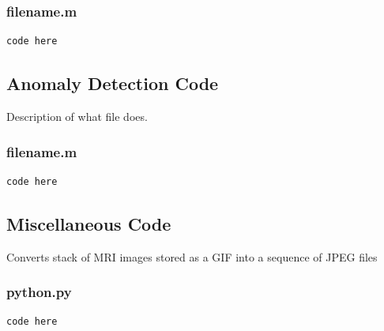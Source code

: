 \documentclass[12pt]{article}
\theoremstyle{plain}%
\theoremstyle{definition}
\theoremstyle{remark}
\begin{document}
\subsubsection{filename.m}
\begin{verbatim}
code here
\end{verbatim}

\subsection{Anomaly Detection Code}
Description of what file does.
\subsubsection{filename.m}
\begin{verbatim}
code here
\end{verbatim}

\subsection{Miscellaneous Code}
Converts stack of MRI images stored as a GIF into a sequence of JPEG files
\subsubsection{python.py}
\begin{verbatim}
code here
\end{verbatim}
\end{document}
